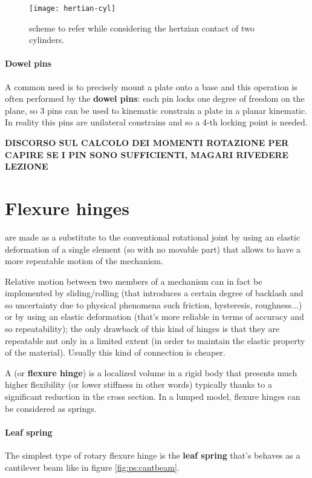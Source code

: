 		\begin{SCfigure}[2][bht]
			\centering
			\texttt{[image: hertian-cyl]}
			\caption{scheme to refer while considering the hertzian contact of two cylinders.}
		\end{SCfigure}
	
		\paragraph{Dowel pins} A common need is to precisely mount a plate onto a base and this operation is often performed by the \textbf{dowel pins}: each pin locks one degree of freedom on the plane, so 3 pins can be used to kinematic constrain a plate in a planar kinematic. In reality this pins are unilateral constrains and so a 4-th locking point is needed.
		
		\textbf{DISCORSO SUL CALCOLO DEI MOMENTI ROTAZIONE PER CAPIRE SE I PIN SONO SUFFICIENTI, MAGARI RIVEDERE LEZIONE}
	

\section{Flexure hinges}
	 are made as a substitute to the conventional rotational joint by using an elastic deformation of a single element (so with no movable part) that allows to have a more repeatable motion of the mechanism.
	
	Relative motion between two members of a mechanism can in fact be implemented by sliding/rolling (that introduces a certain degree of backlash and so uncertainty due to physical phenomena such friction, hysteresis, roughness...) or by using an elastic deformation (that's more reliable in terms of accuracy and so repeatability); the only drawback of this kind of hinges is that they are repeatable nut only in a limited extent (in order to maintain the elastic property of the material). Usually this kind of connection is cheaper. 
	
	A  (or \textbf{flexure hinge}) is a localized volume in a rigid body that presents much higher flexibility (or lower stiffness in other words) typically thanks to a significant reduction in the cross section. In a lumped model, flexure hinges can be considered as springs.
	
	\paragraph{Leaf spring} The simplest type of rotary flexure hinge is the \textbf{leaf spring} that's behaves as a cantilever beam like in figure \ref{fig:ps:cantbeam}.
	
